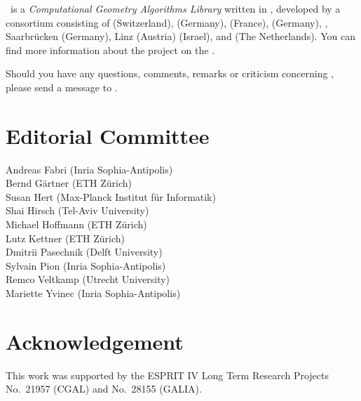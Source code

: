 \cleardoublepage
{}


\cgal\ is a {\em Computational Geometry Algorithms Library} written in \CC, 
developed by a consortium consisting of
 (Switzerland), 
 (Germany), 
 (France),
 (Germany),
,
Saarbr\"ucken (Germany),
 Linz (Austria)
 (Israel), and
 (The Netherlands). 
You can find more information about the project on the 
.

Should you have any questions, comments, remarks or criticism concerning 
\cgal, please send a message to 
.

\section*{Editorial Committee}

Andreas Fabri ({\sc Inria} Sophia-Antipolis) \\
Bernd G\"artner (ETH Z\"urich) \\
Susan Hert (Max-Planck Institut f\"ur Informatik)\\
Shai Hirsch (Tel-Aviv University) \\
Michael Hoffmann (ETH Z\"urich) \\
Lutz Kettner (ETH Z\"urich) \\
Dmitrii Pasechnik (Delft University) \\
Sylvain Pion ({\sc Inria} Sophia-Antipolis)\\
Remco Veltkamp (Utrecht University)\\
Mariette Yvinec ({\sc Inria} Sophia-Antipolis)\\


\section*{Acknowledgement}

This work was supported
by the ESPRIT IV Long Term Research Projects No.~21957 (CGAL) 
and No.~28155 (GALIA).


